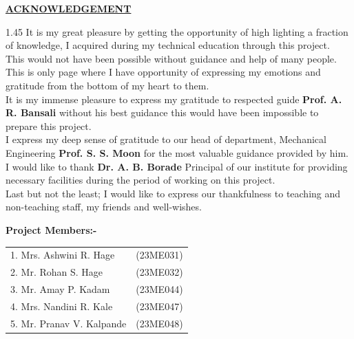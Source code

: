 \thispagestyle{empty}

\vspace*{-5mm}
\begin{center}
  {\fontsize{18}{22}\selectfont \bfseries \textcolor{red!80!black}{\underline{ACKNOWLEDGEMENT}}}\\[8mm]
\end{center}

\noindent
\begin{spacing}{1.45}
{\fontsize{11}{16}\selectfont
It is my great pleasure by getting the opportunity of high lighting a fraction of knowledge, I acquired during my technical education through this project.\\[3mm]
This would not have been possible without guidance and help of many people. This is only page where I have opportunity of expressing my emotions and gratitude from the bottom of my heart to them.\\[3mm]
It is my immense pleasure to express my gratitude to respected guide \textbf{Prof. A. R. Bansali} without his best guidance this would have been impossible to prepare this project.\\[3mm]
I express my deep sense of gratitude to our head of department, Mechanical Engineering \textbf{Prof. S. S. Moon} for the most valuable guidance provided by him.\\[3mm]
I would like to thank \textbf{Dr. A. B. Borade} Principal of our institute for providing necessary facilities during the period of working on this project.\\[3mm]
Last but not the least; I would like to express our thankfulness to teaching and non-teaching staff, my friends and well-wishes.
}
\end{spacing}

\vspace{8mm}
\noindent
\textbf{Project Members:-}\\[3mm]
\begin{tabular}{ll}
  1. Mrs. Ashwini R. Hage & (23ME031) \\
  2. Mr. Rohan S. Hage & (23ME032) \\
  3. Mr. Amay P. Kadam & (23ME044) \\
  4. Mrs. Nandini R. Kale & (23ME047) \\
  5. Mr. Pranav V. Kalpande & (23ME048)
\end{tabular}
\clearpage
